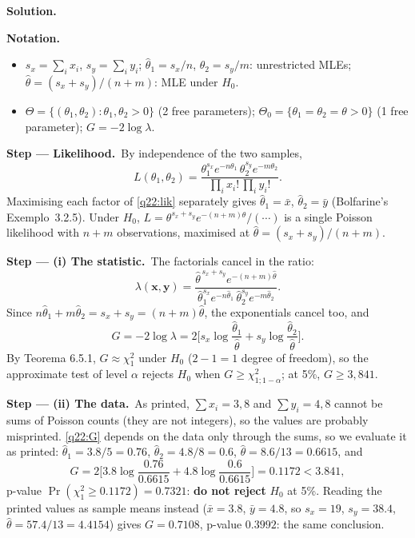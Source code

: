 \documentclass[11pt,a4paper]{article}
\numberwithin{equation}{questao}   %
\newenvironment{notacao}{\par\smallskip\noindent\textbf{Notation.}\begin{itemize}[leftmargin=1.4em,topsep=1pt,itemsep=0pt]\small}{\end{itemize}}
\newcommand{\passo}[2]{\par\smallskip\noindent\textbf{Step --- #1.}~#2}
\newcommand{\solhead}{\par\medskip\noindent{\color{blue!55!black}\rule{\linewidth}{0.3pt}}\par\noindent\textbf{Solution.}}
\begin{document}
\begin{sol}
\solhead
\begin{notacao}
\item $s_x=\sum_ix_i$, $s_y=\sum_iy_i$; $\hat\theta_1=s_x/n$, $\hat\theta_2=s_y/m$: unrestricted MLEs;
  $\hat\theta=(s_x+s_y)/(n+m)$: MLE under $H_0$.
\item $\Theta=\{(\theta_1,\theta_2):\theta_1,\theta_2>0\}$ (2 free parameters);
  $\Theta_0=\{\theta_1=\theta_2=\theta>0\}$ (1 free parameter); $G=-2\log\lambda$.
\end{notacao}

\passo{Likelihood}{By independence of the two samples,}
\begin{equation}\label{q22:lik}
L(\theta_1,\theta_2)=\frac{\theta_1^{s_x}e^{-n\theta_1}\,\theta_2^{s_y}e^{-m\theta_2}}{\prod_ix_i!\,\prod_iy_i!} .
\end{equation}
Maximising each factor of \eqref{q22:lik} separately gives $\hat\theta_1=\bar x$, $\hat\theta_2=\bar y$
(Bolfarine's Exemplo~3.2.5). Under $H_0$, $L=\theta^{s_x+s_y}e^{-(n+m)\theta}/(\cdots)$ is a single Poisson
likelihood with $n+m$ observations, maximised at $\hat\theta=(s_x+s_y)/(n+m)$.

\passo{(i) The statistic}{The factorials cancel in the ratio:}
\[
\lambda(\mathbf x,\mathbf y)=\frac{\hat\theta^{\,s_x+s_y}e^{-(n+m)\hat\theta}}
{\hat\theta_1^{s_x}e^{-n\hat\theta_1}\,\hat\theta_2^{s_y}e^{-m\hat\theta_2}} .
\]
Since $n\hat\theta_1+m\hat\theta_2=s_x+s_y=(n+m)\hat\theta$, the exponentials cancel too, and
\begin{equation}\label{q22:G}
G=-2\log\lambda=2\Big[s_x\log\frac{\hat\theta_1}{\hat\theta}+s_y\log\frac{\hat\theta_2}{\hat\theta}\Big].
\end{equation}
By Teorema 6.5.1, $G\approx\chi^2_1$ under $H_0$ ($2-1=1$ degree of freedom), so the approximate test
of level $\alpha$ rejects $H_0$ when $G\ge\chi^2_{1;1-\alpha}$; at 5\%, $G\ge3{,}841$.

\passo{(ii) The data}{As printed, $\sum x_i=3{,}8$ and $\sum y_i=4{,}8$ cannot be sums of Poisson
counts (they are not integers), so the values are probably misprinted. \eqref{q22:G} depends on the
data only through the sums, so we evaluate it as printed:
$\hat\theta_1=3.8/5=0.76$, $\hat\theta_2=4.8/8=0.6$, $\hat\theta=8.6/13=0.6615$, and}
\[
G=2\Big[3.8\log\frac{0.76}{0.6615}+4.8\log\frac{0.6}{0.6615}\Big]=0.1172<3.841,
\]
p-value $\Pr(\chi^2_1\ge0.1172)=0.7321$: \textbf{do not reject} $H_0$ at 5\%. Reading the printed values
as sample means instead ($\bar x=3.8$, $\bar y=4.8$, so $s_x=19$, $s_y=38.4$, $\hat\theta=57.4/13=4.4154$)
gives $G=0.7108$, p-value $0.3992$: the same conclusion.


\end{sol}
\end{document}
